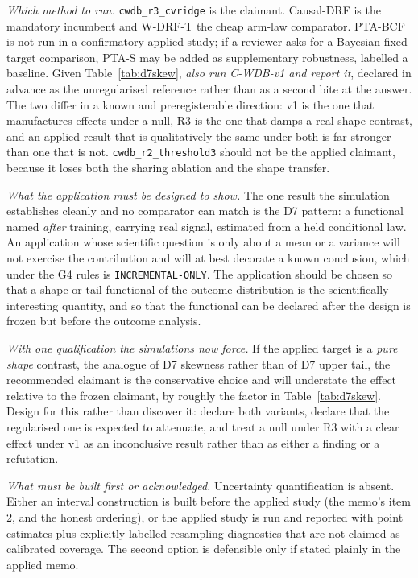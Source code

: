 \documentclass[11pt,a4paper]{article}
\theoremstyle{definition}
\theoremstyle{remark}
\begin{document}
\emph{Which method to run.} \texttt{cwdb\_r3\_cvridge} is the claimant.
Causal-DRF is the mandatory incumbent and W-DRF-T the cheap arm-law comparator.
PTA-BCF is not run in a confirmatory applied study; if a reviewer asks for a
Bayesian fixed-target comparison, PTA-S may be added as supplementary robustness,
labelled a baseline. Given Table~\ref{tab:d7skew}, \emph{also run C-WDB-v1 and
report it}, declared in advance as the unregularised reference rather than as a
second bite at the answer. The two differ in a known and preregisterable
direction: v1 is the one that manufactures effects under a null, R3 is the one
that damps a real shape contrast, and an applied result that is qualitatively the
same under both is far stronger than one that is not.
\texttt{cwdb\_r2\_threshold3} should not be the applied claimant, because it
loses both the sharing ablation and the shape transfer.

\emph{What the application must be designed to show.} The one result the
simulation establishes cleanly and no comparator can match is the D7 pattern: a
functional named \emph{after} training, carrying real signal, estimated from a
held conditional law. An application whose scientific question is only about a
mean or a variance will not exercise the contribution and will at best decorate a
known conclusion, which under the G4 rules is \texttt{INCREMENTAL-ONLY}. The
application should be chosen so that a shape or tail functional of the outcome
distribution is the scientifically interesting quantity, and so that the
functional can be declared after the design is frozen but before the outcome
analysis.

\emph{With one qualification the simulations now force.} If the applied target is
a \emph{pure shape} contrast, the analogue of D7 skewness rather than of D7 upper
tail, the recommended claimant is the conservative choice and will understate the
effect relative to the frozen claimant, by roughly the factor in
Table~\ref{tab:d7skew}. Design for this rather than discover it: declare both
variants, declare that the regularised one is expected to attenuate, and treat a
null under R3 with a clear effect under v1 as an inconclusive result rather than
as either a finding or a refutation.

\emph{What must be built first or acknowledged.} Uncertainty quantification is
absent. Either an interval construction is built before the applied study (the
memo's item 2, and the honest ordering), or the applied study is run and reported
with point estimates plus explicitly labelled resampling diagnostics that are not
claimed as calibrated coverage. The second option is defensible only if stated
plainly in the applied memo.
\end{document}
